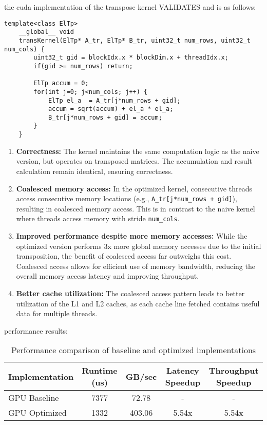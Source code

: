 \documentclass{article}
\begin{document}
\begin{itemize}
    the cuda implementation of the transpose kernel VALIDATES and is as follows:

    \begin{lstlisting}[language=cuda]
    template<class ElTp>
    __global__ void 
    transKernel(ElTp* A_tr, ElTp* B_tr, uint32_t num_rows, uint32_t num_cols) {
        uint32_t gid = blockIdx.x * blockDim.x + threadIdx.x;
        if(gid >= num_rows) return;
    
        ElTp accum = 0;
        for(int j=0; j<num_cols; j++) {
            ElTp el_a  = A_tr[j*num_rows + gid];
            accum = sqrt(accum) + el_a * el_a;
            B_tr[j*num_rows + gid] = accum;
        }
    }
    \end{lstlisting}

    \begin{enumerate}
        \item \textbf{Correctness:} The kernel maintains the same computation logic as the naive version, but operates on transposed matrices. The accumulation and result calculation remain identical, ensuring correctness.
        
        \item \textbf{Coalesced memory access:} In the optimized kernel, consecutive threads access consecutive memory locations (e.g., \texttt{A\_tr[j*num\_rows + gid]}), resulting in coalesced memory access. This is in contrast to the naive kernel where threads access memory with stride \texttt{num\_cols}.
        
        \item \textbf{Improved performance despite more memory accesses:} While the optimized version performs 3x more global memory accesses due to the initial transposition, the benefit of coalesced access far outweighs this cost. Coalesced access allows for efficient use of memory bandwidth, reducing the overall memory access latency and improving throughput.
        
        \item \textbf{Better cache utilization:} The coalesced access pattern leads to better utilization of the L1 and L2 caches, as each cache line fetched contains useful data for multiple threads.
    \end{enumerate}

    performance results:
    \begin{table}[h]
        \centering
        \begin{tabular}{|l|c|c|c|c|}
        \hline
        \textbf{Implementation} & \textbf{Runtime (us)} & \textbf{GB/sec} & \textbf{Latency Speedup} & \textbf{Throughput Speedup} \\
        \hline
        GPU Baseline & 7377 & 72.78 & - & - \\
        GPU Optimized & 1332 & 403.06 & 5.54x & 5.54x \\
        \hline
        \end{tabular}
        \caption{Performance comparison of baseline and optimized implementations}
        \label{tab:performance-comparison}
    \end{table}


\end{itemize}
\end{document}
